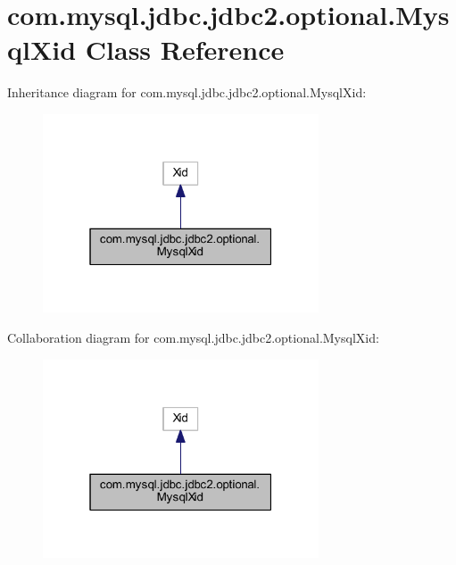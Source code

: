 \hypertarget{classcom_1_1mysql_1_1jdbc_1_1jdbc2_1_1optional_1_1_mysql_xid}{}\section{com.\+mysql.\+jdbc.\+jdbc2.\+optional.\+Mysql\+Xid Class Reference}
\label{classcom_1_1mysql_1_1jdbc_1_1jdbc2_1_1optional_1_1_mysql_xid}


Inheritance diagram for com.\+mysql.\+jdbc.\+jdbc2.\+optional.\+Mysql\+Xid\+:
\nopagebreak
\begin{figure}[H]
\begin{center}
\leavevmode
\includegraphics[width=232pt]{classcom_1_1mysql_1_1jdbc_1_1jdbc2_1_1optional_1_1_mysql_xid__inherit__graph}
\end{center}
\end{figure}


Collaboration diagram for com.\+mysql.\+jdbc.\+jdbc2.\+optional.\+Mysql\+Xid\+:
\nopagebreak
\begin{figure}[H]
\begin{center}
\leavevmode
\includegraphics[width=232pt]{classcom_1_1mysql_1_1jdbc_1_1jdbc2_1_1optional_1_1_mysql_xid__coll__graph}
\end{center}
\end{figure}
